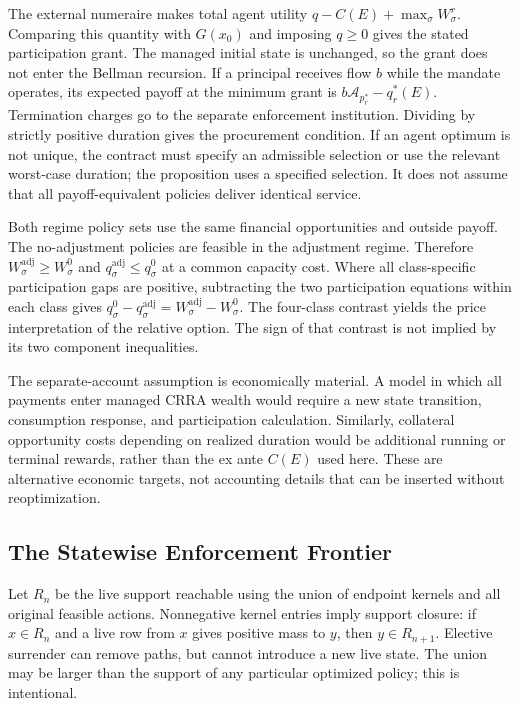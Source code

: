The external numeraire makes total agent utility $q-C(E)+\max_\sigma W^r_\sigma$. Comparing this quantity with $G(x_0)$ and imposing $q\geq0$ gives the stated participation grant. The managed initial state is unchanged, so the grant does not enter the Bellman recursion. If a principal receives flow $b$ while the mandate operates, its expected payoff at the minimum grant is $b\mathcal A_{p_r^*}-q_r^*(E)$. Termination charges go to the separate enforcement institution. Dividing by strictly positive duration gives the procurement condition. If an agent optimum is not unique, the contract must specify an admissible selection or use the relevant worst-case duration; the proposition uses a specified selection. It does not assume that all payoff-equivalent policies deliver identical service.

Both regime policy sets use the same financial opportunities and outside payoff. The no-adjustment policies are feasible in the adjustment regime. Therefore $W^{\mathrm{adj}}_\sigma\geq W^0_\sigma$ and $q^{\mathrm{adj}}_\sigma\leq q^0_\sigma$ at a common capacity cost. Where all class-specific participation gaps are positive, subtracting the two participation equations within each class gives $q^0_\sigma-q^{\mathrm{adj}}_\sigma=W^{\mathrm{adj}}_\sigma-W^0_\sigma$. The four-class contrast yields the price interpretation of the relative option. The sign of that contrast is not implied by its two component inequalities.

The separate-account assumption is economically material. A model in which all payments enter managed CRRA wealth would require a new state transition, consumption response, and participation calculation. Similarly, collateral opportunity costs depending on realized duration would be additional running or terminal rewards, rather than the ex ante $C(E)$ used here. These are alternative economic targets, not accounting details that can be inserted without reoptimization.

\subsection{The Statewise Enforcement Frontier}
Let $R_n$ be the live support reachable using the union of endpoint kernels and all original feasible actions. Nonnegative kernel entries imply support closure: if $x\in R_n$ and a live row from $x$ gives positive mass to $y$, then $y\in R_{n+1}$. Elective surrender can remove paths, but cannot introduce a new live state. The union may be larger than the support of any particular optimized policy; this is intentional.

